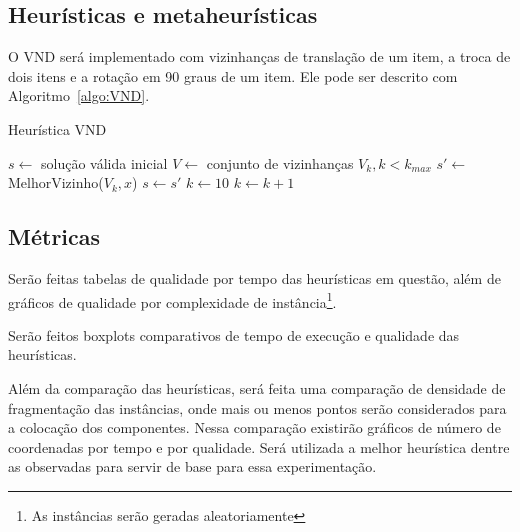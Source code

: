 \documentclass[12pt]{article}
\begin{document}
        \subsection{Heurísticas e metaheurísticas} %
        \label{sub:Heurísticas e metaheurísticas}
            O VND será implementado com vizinhanças de translação de um item, a troca de dois itens e a rotação em 90 graus de um item. Ele pode ser
            descrito com Algoritmo~\ref{algo:VND}.
            \begin{algorithm}
                \algrenewcommand{}
                \algrenewcommand{}
                \caption{Heurística VND}
                \label{algo:VND}
                \begin{algorithmic}[1]

                    \State $s \gets$ solução válida inicial
                    \State $V \gets$ conjunto de vizinhanças $V_k, k < k_{max}$
                        \State $s' \gets $ MelhorVizinho($V_k, x$)
                            \State $s \gets s'$
                            \State $k \gets 1$0
                        \Else
                            \State $k \gets k + 1$
                        \EndIf
                    \EndWhile
                \end{algorithmic}
            \end{algorithm}


        \subsection{Métricas} %
        \label{sub:Métricas}
            Serão feitas tabelas de qualidade por tempo das heurísticas em questão, além de gráficos de qualidade por complexidade de
            instância\footnote{As instâncias serão geradas aleatoriamente}.

            Serão feitos boxplots comparativos de tempo de execução e qualidade das heurísticas.

            Além da comparação das heurísticas, será feita uma comparação de densidade de fragmentação das instâncias, onde mais ou menos
            pontos serão considerados para a colocação dos componentes. Nessa comparação existirão gráficos de número de coordenadas por tempo e por qualidade.
            Será utilizada a melhor heurística dentre as observadas para servir de base para essa experimentação.
\end{document}
